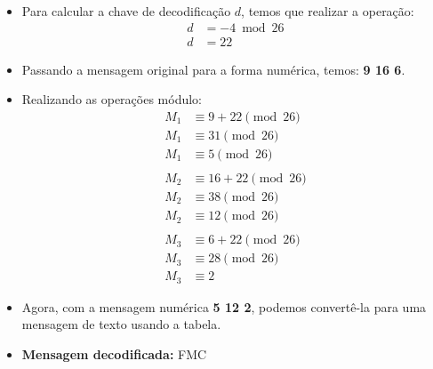 \begin{itemize}
    \item Para calcular a chave de decodificação $d$, temos que realizar a operação:
          \begin{align*}
              d & = -4 \bmod 26 \\
              d & = 22
          \end{align*}
    \item Passando a mensagem original para a forma numérica, temos: \textbf{9 16 6}.
    \item Realizando as operações módulo:
          \begin{align*}
              M_1 & \equiv 9 + 22 \pmod {26}  \\
              M_1 & \equiv 31 \pmod {26}      \\
              M_1 & \equiv 5 \pmod {26}       \\
              \\
              M_2 & \equiv 16 + 22 \pmod {26} \\
              M_2 & \equiv 38 \pmod {26}      \\
              M_2 & \equiv 12 \pmod {26}      \\
              \\
              M_3 & \equiv 6 + 22 \pmod {26}  \\
              M_3 & \equiv 28 \pmod{26}       \\
              M_3 & \equiv 2
          \end{align*}
    \item Agora, com a mensagem numérica \textbf{5 12 2}, podemos convertê-la para uma mensagem de texto usando a tabela.
    \item \textbf{Mensagem decodificada:} FMC
\end{itemize}